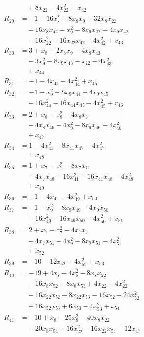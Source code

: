 \begin{align*}
&\quad{}+8x_{22}-4x_{22}^{2}+x_{42}\\
R_{29}&=-1-16x_{8}^{2}-8x_{8}x_{9}-32x_{8}x_{22}\\
&\quad{}-16x_{8}x_{42}-x_{9}^{2}-8x_{9}x_{22}-4x_{9}x_{42}\\
&\quad{}-16x_{22}^{2}-16x_{22}x_{42}-4x_{42}^{2}+x_{43}\\
R_{30}&=3+x_{8}-2x_{8}x_{9}-4x_{8}x_{43}\\
&\quad{}-3x_{9}^{2}-8x_{9}x_{43}-x_{22}-4x_{43}^{2}\\
&\quad{}+x_{44}\\
R_{31}&=-1-4x_{44}-4x_{44}^{2}+x_{45}\\
R_{32}&=-1-x_{9}^{2}-8x_{9}x_{44}-4x_{9}x_{45}\\
&\quad{}-16x_{44}^{2}-16x_{44}x_{45}-4x_{45}^{2}+x_{46}\\
R_{33}&=2+x_{8}-x_{8}^{2}-4x_{8}x_{9}\\
&\quad{}-4x_{8}x_{46}-4x_{9}^{2}-8x_{9}x_{46}-4x_{46}^{2}\\
&\quad{}+x_{47}\\
R_{34}&=1-4x_{41}^{2}-8x_{41}x_{47}-4x_{47}^{2}\\
&\quad{}+x_{48}\\
R_{35}&=1+x_{7}-x_{7}^{2}-8x_{7}x_{41}\\
&\quad{}-4x_{7}x_{48}-16x_{41}^{2}-16x_{41}x_{48}-4x_{48}^{2}\\
&\quad{}+x_{49}\\
R_{36}&=-1-4x_{49}-4x_{49}^{2}+x_{50}\\
R_{37}&=-1-x_{9}^{2}-8x_{9}x_{49}-4x_{9}x_{50}\\
&\quad{}-16x_{49}^{2}-16x_{49}x_{50}-4x_{50}^{2}+x_{51}\\
R_{38}&=2+x_{7}-x_{7}^{2}-4x_{7}x_{9}\\
&\quad{}-4x_{7}x_{51}-4x_{9}^{2}-8x_{9}x_{51}-4x_{51}^{2}\\
&\quad{}+x_{52}\\
R_{39}&=-10-12x_{52}-4x_{52}^{2}+x_{53}\\
R_{40}&=-19+4x_{8}-4x_{8}^{2}-8x_{8}x_{22}\\
&\quad{}-16x_{8}x_{52}-8x_{8}x_{53}+4x_{22}-4x_{22}^{2}\\
&\quad{}-16x_{22}x_{52}-8x_{22}x_{53}-16x_{52}-24x_{52}^{2}\\
&\quad{}-16x_{52}x_{53}+6x_{53}-4x_{53}^{2}+x_{54}\\
R_{41}&=-10+x_{8}-25x_{8}^{2}-40x_{8}x_{22}\\
&\quad{}-20x_{8}x_{54}-16x_{22}^{2}-16x_{22}x_{54}-12x_{47}\\

\end{align*}

